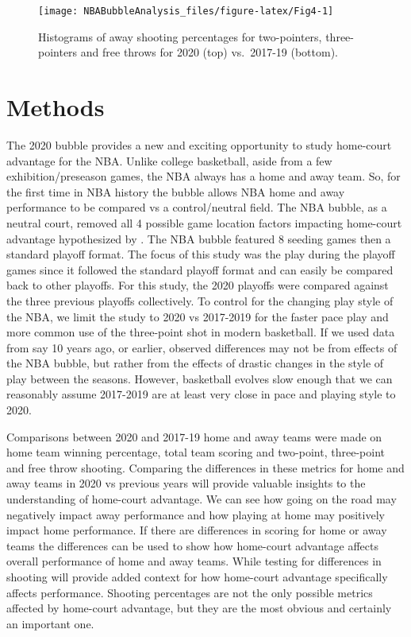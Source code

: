 \documentclass[12pt, letterpaper, titlepage]{article}
\begin{document}
\begin{figure}
  \centering
  \texttt{[image: NBABubbleAnalysis\_files/figure-latex/Fig4-1]}
  \caption{Histograms of away shooting percentages for two-pointers,
    three-pointers and free throws for 2020 (top) vs.~2017-19
    (bottom).}
  \label{fig:Fig4}  
\end{figure}

\hypertarget{sec:methods}{%
\section{Methods}\label{sec:methods}}

The 2020 bubble provides a new and exciting opportunity to study home-court
advantage for the NBA. Unlike college basketball, aside from a few
exhibition/preseason games, the NBA always has a home and away team. So, for
the first time in NBA history the bubble allows NBA home and away performance
to be compared vs a control/neutral field. The NBA bubble, as a neutral court,
removed all 4 possible game location factors impacting home-court advantage
hypothesized by \citet{Carron1992}. The NBA bubble featured 8 seeding games then a
standard playoff format. The focus of this study was the play during the playoff
games since it followed the standard playoff format and can easily be compared
back to other playoffs. For this study, the 2020 playoffs were compared against
the three previous playoffs collectively. To control
for the changing play style of the NBA, we limit the study to 2020 vs 2017-2019
for the faster pace play and more common use of the three-point shot
in modern basketball. If we used data from say 10 years ago, or earlier, observed
differences may not be from effects of the NBA bubble, but rather from the effects
of drastic changes in the style of play between the seasons. However, basketball
evolves slow enough that we can reasonably assume 2017-2019 are at least very
close in pace and playing style to 2020.

Comparisons between 2020 and 2017-19 home and away teams were made on home team
winning percentage, total team scoring and two-point, three-point and free throw
shooting. Comparing the differences in these metrics for home and away teams in
2020 vs previous years will provide valuable insights to the understanding of
home-court advantage. We can see how going on the road may negatively impact
away performance and how playing at home may positively impact home performance.
If there are differences in scoring for home or away teams the differences can
be used to show how home-court advantage affects overall performance of home
and away teams. While testing for differences in shooting will provide added
context for how home-court advantage specifically affects performance.
Shooting percentages are not the only possible metrics affected by home-court
advantage, but they are the most obvious and certainly an important one.
\end{document}
